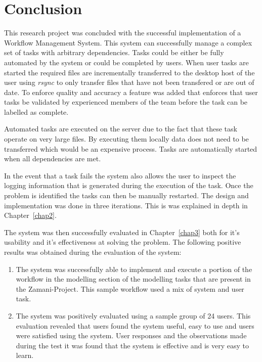 \chapter{Conclusion\label{chap4}}
This research project was concluded with the successful implementation of a
Workflow Management System. This system can successfully manage a complex set
of tasks with arbitrary dependencies. Tasks could be either be fully automated
by the system or could be completed by users. When user tasks are started the 
required files are incrementally transferred to the desktop host of the user
using \emph{rsync} to only transfer files that have not been transfered or are 
out of date. To enforce quality and accuracy a feature was added that enforces
that user tasks be validated by experienced members of the team before the task
can be labelled as complete.

Automated tasks are executed on the
server due to the fact that these task operate on very large files. By executing
them locally data does not need to be transferred which would be an expensive
process. Tasks are automatically started when all dependencies are met. 

In the event that a task fails the system also allows the user to inspect the
logging information that is generated during the execution of the task. Once the
problem is identified the tasks can then be manually restarted.  The design and
implementation was done in three iterations. This is was explained in depth in 
Chapter~\ref{chap2}.


The system was then successfully evaluated in Chapter~\ref{chap3} both for it's
usability and it's effectiveness at solving the problem. The following positive
results was obtained during the evaluation of the system:
\begin{enumerate}
    \item The system was successfully able to implement and execute a portion of
        the workflow in the modelling section of the modelling tasks that are
        present in the Zamani-Project. This sample workflow used a mix of system
        and user task.
    \item The system was positively evaluated using a sample group of 24 users.
        This evaluation revealed that users found the system useful, easy to
        use and users were satisfied using the system. User responses and the 
        observations made during the test it was found that the system is
        effective and is very easy to learn. 
\end{enumerate}

